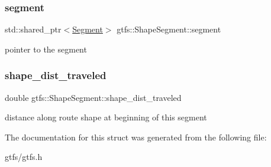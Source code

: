 \subsubsection{\texorpdfstring{segment}{segment}}
{\footnotesize\ttfamily std\+::shared\+\_\+ptr$<$\hyperlink{classgtfs_1_1Segment}{Segment}$>$ gtfs\+::\+Shape\+Segment\+::segment}

pointer to the segment \mbox{\label{structgtfs_1_1ShapeSegment_a64afdd03235b9bc256fc18652c6f9c47}} 
\subsubsection{\texorpdfstring{shape\+\_\+dist\+\_\+traveled}{shape\_dist\_traveled}}
{\footnotesize\ttfamily double gtfs\+::\+Shape\+Segment\+::shape\+\_\+dist\+\_\+traveled}

distance along route shape at beginning of this segment 

The documentation for this struct was generated from the following file\+:\begin{DoxyCompactItemize}
\item 
gtfs/gtfs.\+h\end{DoxyCompactItemize}
